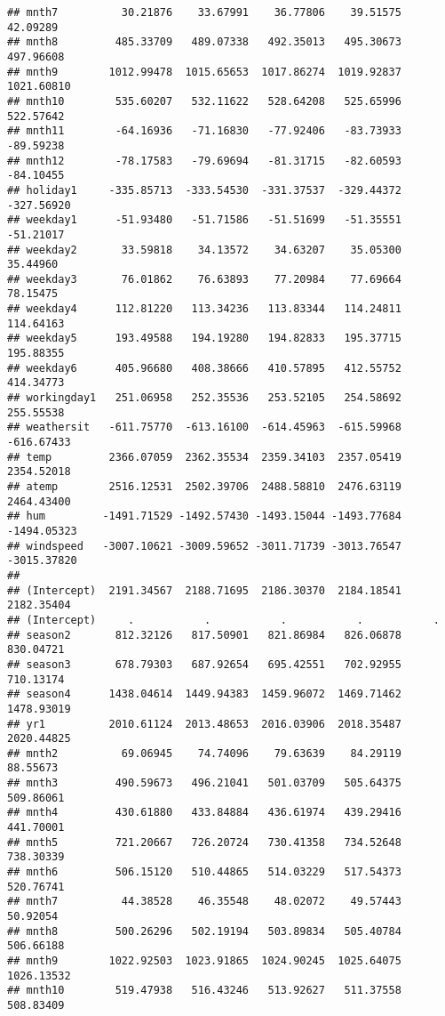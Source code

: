 \documentclass[]{article}
\begin{document}
\begin{verbatim}
## mnth7          30.21876    33.67991    36.77806    39.51575    42.09289
## mnth8         485.33709   489.07338   492.35013   495.30673   497.96608
## mnth9        1012.99478  1015.65653  1017.86274  1019.92837  1021.60810
## mnth10        535.60207   532.11622   528.64208   525.65996   522.57642
## mnth11        -64.16936   -71.16830   -77.92406   -83.73933   -89.59238
## mnth12        -78.17583   -79.69694   -81.31715   -82.60593   -84.10455
## holiday1     -335.85713  -333.54530  -331.37537  -329.44372  -327.56920
## weekday1      -51.93480   -51.71586   -51.51699   -51.35551   -51.21017
## weekday2       33.59818    34.13572    34.63207    35.05300    35.44960
## weekday3       76.01862    76.63893    77.20984    77.69664    78.15475
## weekday4      112.81220   113.34236   113.83344   114.24811   114.64163
## weekday5      193.49588   194.19280   194.82833   195.37715   195.88355
## weekday6      405.96680   408.38666   410.57895   412.55752   414.34773
## workingday1   251.06958   252.35536   253.52105   254.58692   255.55538
## weathersit   -611.75770  -613.16100  -614.45963  -615.59968  -616.67433
## temp         2366.07059  2362.35534  2359.34103  2357.05419  2354.52018
## atemp        2516.12531  2502.39706  2488.58810  2476.63119  2464.43400
## hum         -1491.71529 -1492.57430 -1493.15044 -1493.77684 -1494.05323
## windspeed   -3007.10621 -3009.59652 -3011.71739 -3013.76547 -3015.37820
##                                                                        
## (Intercept)  2191.34567  2188.71695  2186.30370  2184.18541  2182.35404
## (Intercept)     .           .           .           .           .      
## season2       812.32126   817.50901   821.86984   826.06878   830.04721
## season3       678.79303   687.92654   695.42551   702.92955   710.13174
## season4      1438.04614  1449.94383  1459.96072  1469.71462  1478.93019
## yr1          2010.61124  2013.48653  2016.03906  2018.35487  2020.44825
## mnth2          69.06945    74.74096    79.63639    84.29119    88.55673
## mnth3         490.59673   496.21041   501.03709   505.64375   509.86061
## mnth4         430.61880   433.84884   436.61974   439.29416   441.70001
## mnth5         721.20667   726.20724   730.41358   734.52648   738.30339
## mnth6         506.15120   510.44865   514.03229   517.54373   520.76741
## mnth7          44.38528    46.35548    48.02072    49.57443    50.92054
## mnth8         500.26296   502.19194   503.89834   505.40784   506.66188
## mnth9        1022.92503  1023.91865  1024.90245  1025.64075  1026.13532
## mnth10        519.47938   516.43246   513.92627   511.37558   508.83409

\end{verbatim}
\end{document}

